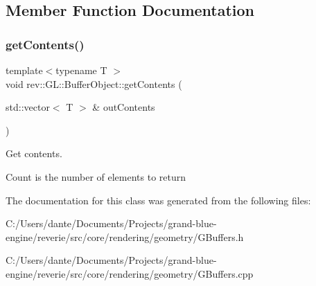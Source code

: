 \subsection{Member Function Documentation}
\mbox{\label{classrev_1_1_g_l_1_1_buffer_object_a3f896c126a6156121373e6c71cdd7fe5}} 
\subsubsection{\texorpdfstring{getContents()}{getContents()}}
{\footnotesize\ttfamily template$<$typename T $>$ \\
void rev\+::\+G\+L\+::\+Buffer\+Object\+::get\+Contents (\begin{DoxyParamCaption}\item[{std\+::vector$<$ T $>$ \&}]{out\+Contents }\end{DoxyParamCaption})\hspace{0.3cm}{\ttfamily [inline]}}



Get contents. 

Count is the number of elements to return 

The documentation for this class was generated from the following files\+:\begin{DoxyCompactItemize}
\item 
C\+:/\+Users/dante/\+Documents/\+Projects/grand-\/blue-\/engine/reverie/src/core/rendering/geometry/G\+Buffers.\+h\item 
C\+:/\+Users/dante/\+Documents/\+Projects/grand-\/blue-\/engine/reverie/src/core/rendering/geometry/G\+Buffers.\+cpp\end{DoxyCompactItemize}

